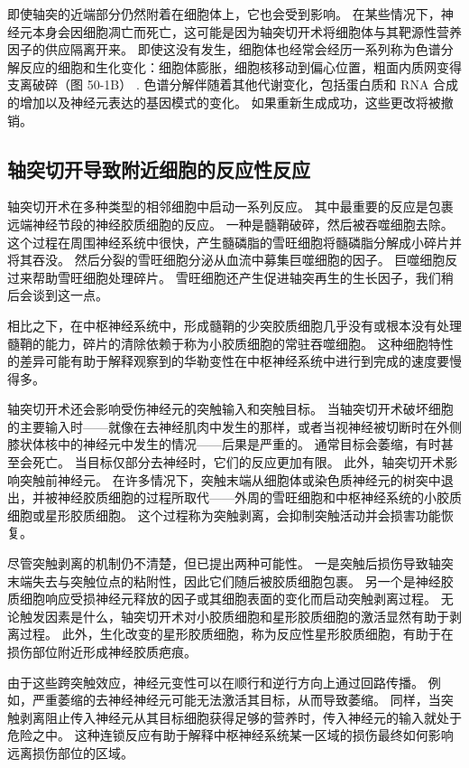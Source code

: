 即使轴突的近端部分仍然附着在细胞体上，它也会受到影响。 在某些情况下，神经元本身会因细胞凋亡而死亡，这可能是因为轴突切开术将细胞体与其靶源性营养因子的供应隔离开来。 即使这没有发生，细胞体也经常会经历一系列称为色谱分解反应的细胞和生化变化：细胞体膨胀，细胞核移动到偏心位置，粗面内质网变得支离破碎（图 50-1B） . 色谱分解伴随着其他代谢变化，包括蛋白质和 RNA 合成的增加以及神经元表达的基因模式的变化。 如果重新生成成功，这些更改将被撤销。

\subsection{轴突切开导致附近细胞的反应性反应}

轴突切开术在多种类型的相邻细胞中启动一系列反应。 其中最重要的反应是包裹远端神经节段的神经胶质细胞的反应。 一种是髓鞘破碎，然后被吞噬细胞去除。 这个过程在周围神经系统中很快，产生髓磷脂的雪旺细胞将髓磷脂分解成小碎片并将其吞没。 然后分裂的雪旺细胞分泌从血流中募集巨噬细胞的因子。 巨噬细胞反过来帮助雪旺细胞处理碎片。 雪旺细胞还产生促进轴突再生的生长因子，我们稍后会谈到这一点。

相比之下，在中枢神经系统中，形成髓鞘的少突胶质细胞几乎没有或根本没有处理髓鞘的能力，碎片的清除依赖于称为小胶质细胞的常驻吞噬细胞。 这种细胞特性的差异可能有助于解释观察到的华勒变性在中枢神经系统中进行到完成的速度要慢得多。

轴突切开术还会影响受伤神经元的突触输入和突触目标。 当轴突切开术破坏细胞的主要输入时——就像在去神经肌肉中发生的那样，或者当视神经被切断时在外侧膝状体核中的神经元中发生的情况——后果是严重的。 通常目标会萎缩，有时甚至会死亡。 当目标仅部分去神经时，它们的反应更加有限。 此外，轴突切开术影响突触前神经元。 在许多情况下，突触末端从细胞体或染色质神经元的树突中退出，并被神经胶质细胞的过程所取代——外周的雪旺细胞和中枢神经系统的小胶质细胞或星形胶质细胞。 这个过程称为突触剥离，会抑制突触活动并会损害功能恢复。

尽管突触剥离的机制仍不清楚，但已提出两种可能性。 一是突触后损伤导致轴突末端失去与突触位点的粘附性，因此它们随后被胶质细胞包裹。 另一个是神经胶质细胞响应受损神经元释放的因子或其细胞表面的变化而启动突触剥离过程。 无论触发因素是什么，轴突切开术对小胶质细胞和星形胶质细胞的激活显然有助于剥离过程。 此外，生化改变的星形胶质细胞，称为反应性星形胶质细胞，有助于在损伤部位附近形成神经胶质疤痕。

由于这些跨突触效应，神经元变性可以在顺行和逆行方向上通过回路传播。 例如，严重萎缩的去神经神经元可能无法激活其目标，从而导致萎缩。 同样，当突触剥离阻止传入神经元从其目标细胞获得足够的营养时，传入神经元的输入就处于危险之中。 这种连锁反应有助于解释中枢神经系统某一区域的损伤最终如何影响远离损伤部位的区域。

